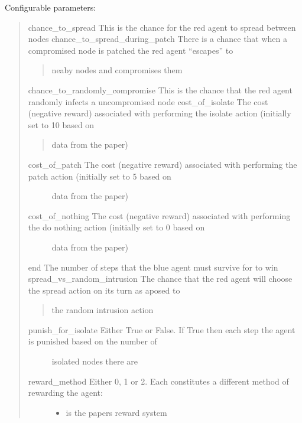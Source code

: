 \documentclass[letterpaper,10pt,english]{sphinxmanual}
\begin{document}
\sphinxAtStartPar
Configurable parameters:
\begin{quote}

\sphinxAtStartPar
chance\_to\_spread \sphinxhyphen{} This is the chance for the red agent to spread between nodes
chance\_to\_spread\_during\_patch \sphinxhyphen{} There is a chance that when a compromised node is patched the red agent “escapes” to
\begin{quote}

\sphinxAtStartPar
neaby nodes and compromises them
\end{quote}

\sphinxAtStartPar
chance\_to\_randomly\_compromise \sphinxhyphen{} This is the chance that the red agent randomly infects a un\sphinxhyphen{}compromised node
cost\_of\_isolate \sphinxhyphen{} The cost (negative reward) associated with performing the isolate action (initially set to 10 based on
\begin{quote}

\sphinxAtStartPar
data from the paper)
\end{quote}
\begin{description}
\item[{cost\_of\_patch \sphinxhyphen{} The cost (negative reward) associated with performing the patch action (initially set to 5 based on}] \leavevmode
\sphinxAtStartPar
data from the paper)

\item[{cost\_of\_nothing \sphinxhyphen{} The cost (negative reward) associated with performing the do nothing action (initially set to 0 based on}] \leavevmode
\sphinxAtStartPar
data from the paper)

\end{description}

\sphinxAtStartPar
end \sphinxhyphen{} The number of steps that the blue agent must survive for to win
spread\_vs\_random\_intrusion \sphinxhyphen{} The chance that the red agent will choose the spread action on its turn as aposed to
\begin{quote}

\sphinxAtStartPar
the random intrusion action
\end{quote}
\begin{description}
\item[{punish\_for\_isolate \sphinxhyphen{} Either True or False. If True then each step the agent is punished based on the number of}] \leavevmode
\sphinxAtStartPar
isolated nodes there are

\item[{reward\_method \sphinxhyphen{} Either 0, 1 or 2. Each constitutes a different method of rewarding the agent:}] \leavevmode\begin{itemize}
\item {}
 is the papers reward system


\end{itemize}
\end{description}
\end{quote}
\end{document}
